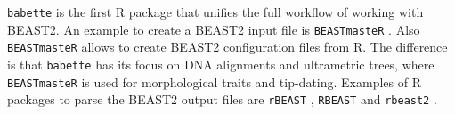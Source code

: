 \documentclass{article}
\begin{document}
\verb;babette; is the first R package that unifies the
full workflow of working with BEAST2. An
example to create a BEAST2 input file is 
\verb;BEASTmasteR; \cite{beastmaster}.
Also \verb;BEASTmasteR; allows 
to create BEAST2 configuration files from R. 
The difference is that \verb;babette; 
has its focus on DNA alignments and ultrametric trees, 
where \verb;BEASTmasteR; is used for 
morphological traits and tip-dating.
Examples of R packages to parse the BEAST2 output files
are \verb;rBEAST; \cite{rBEAST}, 
\verb;RBEAST; \cite{RBEAST} and 
\verb;rbeast2; \cite{rbeast2}. 

\begin{figure}
  \centering
\end{figure}
\end{document}
